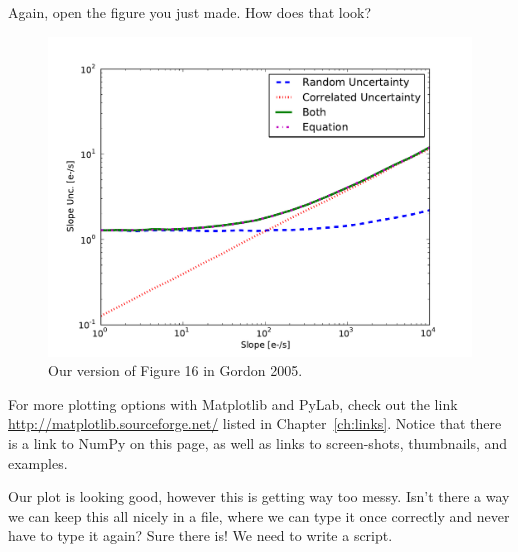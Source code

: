 Again, open the figure you just made.  How does that look?  

\begin{figure}[tbp]
  \centering
    \includegraphics[scale=0.6]{splot_log.pdf}
    \caption{Our version of Figure 16 in Gordon 2005.}
  \label{fig:splot}
\end{figure}

For more
plotting options with Matplotlib and PyLab, check out the link
\url{http://matplotlib.sourceforge.net/} listed in
Chapter~\ref{ch:links}.  Notice that there is a link to NumPy on this
page, as well as links to screen-shots, thumbnails, and examples.

Our plot is looking good, however this is getting way too messy.
Isn't there a way we can keep this all nicely in a file, where we can
type it once correctly and never have to type it again?  Sure there
is!  We need to write a script.
